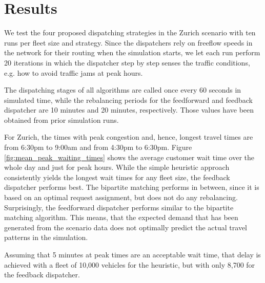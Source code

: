 \section{Results}
\label{sec:results}

We test the four proposed dispatching strategies in the Zurich scenario with ten
runs per fleet size and strategy. Since the dispatchers rely on freeflow speeds in the network
for their routing when the simulation starts, we let each run perform 20 iterations
in which the dispatcher step by step senses the traffic conditions, e.g. how to
avoid traffic jams at peak hours.

The dispatching stages of all algorithms are called once every 60 seconds in
simulated time, while the rebalancing periods for the feedforward and feedback
dispatcher are 10 minutes and 20 minutes, respectively. Those values have been
obtained from prior simulation runs.

For Zurich, the times with peak congestion and, hence, longest travel times
are from 6:30pm to 9:00am and from 4:30pm to 6:30pm. Figure \ref{fig:mean_peak_waiting_times}
shows the average customer wait time over the whole day and just for peak hours.
While the simple heuristic approach consistently yields the longest wait times
for any fleet size, the feedback dispatcher performs best. The bipartite matching
performs in between, since it is based on an optimal request assignment, but does
not do any rebalancing. Surprisingly, the feedforward dispatcher performs similar
to the bipartite matching algorithm. This means, that the expected demand that
has been generated from the scenario data does not optimally predict the actual
travel patterns in the simulation.

Assuming that 5 minutes at peak times are an acceptable wait time, that delay is
achieved with a fleet of 10,000 vehicles for the heuristic, but with only 8,700
for the feedback dispatcher.

\captionsetup[subfigure]{width=0.9\textwidth}

